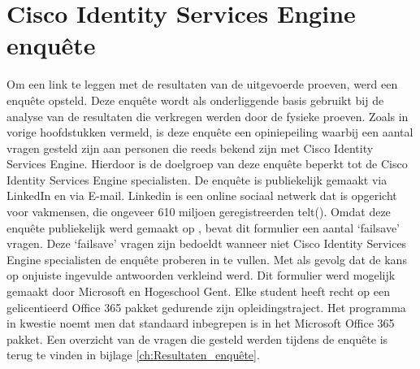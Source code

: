 \section{Cisco Identity Services Engine enquête}
\label{sec:enquête}
Om een link te leggen met de resultaten van de uitgevoerde proeven, werd een enquête opsteld. Deze enquête wordt als onderliggende basis gebruikt bij de analyse van de resultaten die verkregen werden door de fysieke proeven. Zoals in vorige hoofdstukken vermeld, is deze enquête een opiniepeiling waarbij een aantal vragen gesteld zijn aan personen die reeds bekend zijn met Cisco Identity Services Engine. Hierdoor is de doelgroep van deze enquête beperkt tot de Cisco Identity Services Engine specialisten.
\newline
\newline
De enquête is publiekelijk gemaakt via LinkedIn en via E-mail. Linkedin is een online sociaal netwerk dat is opgericht voor vakmensen, die ongeveer 610 miljoen geregistreerden telt(\cite{LinkedTIN}). Omdat deze enquête publiekelijk werd gemaakt op \cite{LinkedIn}, bevat dit formulier een aantal ‘failsave’ vragen. Deze ‘failsave’ vragen zijn bedoeldt wanneer niet Cisco Identity Services Engine specialisten de enquête proberen in te vullen. Met als gevolg dat de kans op onjuiste ingevulde antwoorden verkleind werd.
\newline
\newline
Dit formulier werd mogelijk gemaakt door Microsoft en Hogeschool Gent. Elke student heeft recht op een gelicentieerd Office 365 pakket gedurende zijn opleidingstraject. Het programma in kwestie noemt men \cite{MicrosoftForms} dat standaard inbegrepen is in het Microsoft Office 365 pakket.
\newline
\newline
Een overzicht van de vragen die gesteld werden tijdens de enquête is terug te vinden in bijlage \ref{ch:Resultaten_enquête}.


